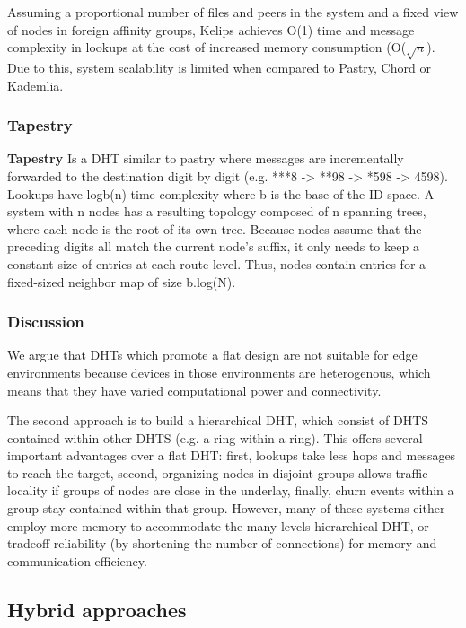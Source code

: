 Assuming a proportional number of files and peers in the system and a fixed view of nodes in foreign affinity groups, Kelips achieves O(1) time and message complexity in lookups at the cost of increased memory consumption (O($\sqrt{n}$). Due to this, system scalability is limited when compared to Pastry, Chord or Kademlia. 

\subsubsection{Tapestry}

\textbf{Tapestry} \cite{tapestry} Is a DHT similar to pastry where messages are incrementally forwarded to the destination digit by digit (e.g. ***8 -> **98 -> *598 -> 4598). Lookups have logb(n) time complexity where b is the base of the ID space. A system with n nodes has a resulting topology composed of n spanning trees, where each node is the root of its own tree. Because nodes assume that the preceding digits all match the current node's suffix, it only needs to keep a constant size of entries at each route level. Thus, nodes contain entries for a fixed-sized neighbor map of size b.log(N). 

\subsubsection{Discussion}

We argue that DHTs which promote a flat design are not suitable for edge environments because devices in those environments are heterogenous, which means that they have varied computational power and connectivity. 

The second approach is to build a hierarchical DHT, which consist of DHTS contained within other DHTS (e.g. a ring within a ring). This offers several important advantages over a flat DHT: first, lookups take less hops and messages to reach the target, second, organizing nodes in disjoint groups allows traffic locality if groups of nodes are close in the underlay, finally, churn events within a group stay contained within that group. However, many of these systems either employ more memory to accommodate the many levels hierarchical DHT, or tradeoff reliability (by shortening the number of connections) for memory and communication efficiency.

\subsection{Hybrid approaches}


